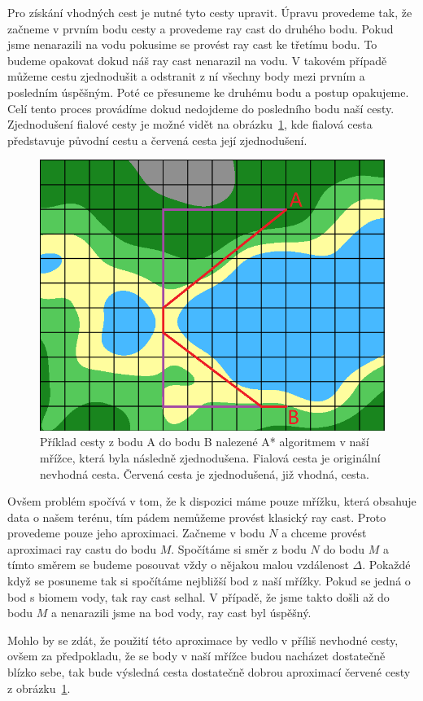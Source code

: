 Pro získání vhodných cest je nutné tyto cesty upravit. Úpravu provedeme tak, že začneme v prvním bodu cesty a provedeme ray cast do druhého bodu. Pokud jsme nenarazili na vodu pokusime se provést ray cast ke třetímu bodu. To budeme opakovat dokud náš ray cast nenarazil na vodu. V takovém případě můžeme cestu zjednodušit a odstranit z ní všechny body mezi prvním a posledním úspěšným. Poté ce přesuneme ke druhému bodu a postup opakujeme. Celí tento proces provádíme dokud nedojdeme do posledního bodu naší cesty. Zjednodušení fialové cesty je možné vidět na obrázku~\ref{fig:path_simplified}, kde fialová cesta představuje původní cestu a červená cesta její zjednodušení.

\begin{figure}[!htb]
    \centering
    \includegraphics[width=0.66\linewidth]{img/path_simplified.png}
    \caption{Příklad cesty z bodu A do bodu B nalezené A* algoritmem v naší mřížce, která byla následně zjednodušena. Fialová cesta je originální nevhodná cesta. Červená cesta je zjednodušená, již vhodná, cesta.}
    \label{fig:path_simplified}
\end{figure}

Ovšem problém spočívá v tom, že k dispozici máme pouze mřížku, která obsahuje data o našem terénu, tím pádem nemůžeme provést klasický ray cast. Proto provedeme pouze jeho aproximaci. Začneme v bodu $N$ a chceme provést aproximaci ray castu do bodu $M$. Spočítáme si směr z bodu $N$ do bodu $M$ a tímto směrem se budeme posouvat vždy o nějakou malou vzdálenost $\Delta$. Pokaždé když se posuneme tak si spočítáme nejbližší bod z naší mřížky. Pokud se jedná o bod s biomem vody, tak ray cast selhal. V případě, že jsme takto došli až do bodu $M$ a nenarazili jsme na bod vody, ray cast byl úspěšný.

Mohlo by se zdát, že použití této aproximace by vedlo v příliš nevhodné cesty, ovšem za předpokladu, že se body v naší mřížce budou nacházet dostatečně blízko sebe, tak bude výsledná cesta dostatečně dobrou aproximací červené cesty z obrázku~\ref{fig:path_simplified}.

